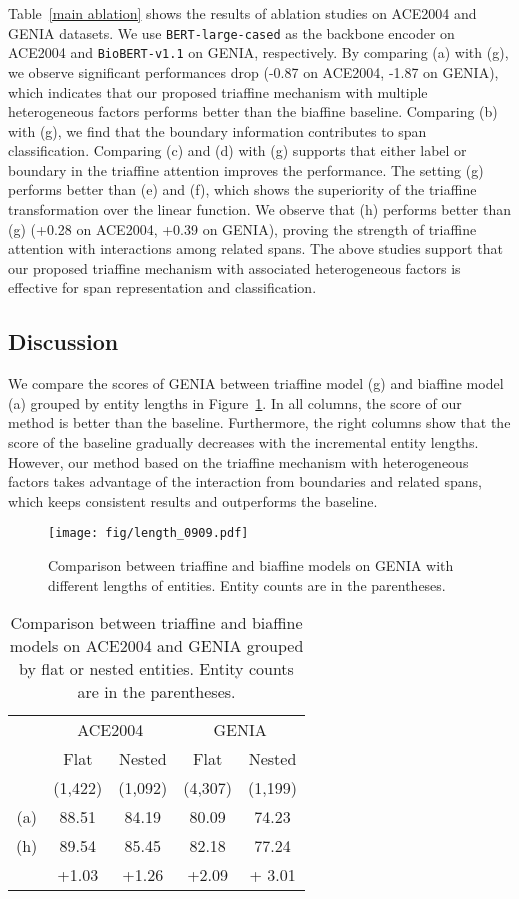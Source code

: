 \documentclass[11pt]{article}
\begin{document}
Table~\ref{main ablation} shows the results of ablation studies on ACE2004 and GENIA datasets. We use \texttt{BERT-large-cased} as the backbone encoder on ACE2004 and \texttt{BioBERT-v1.1} on GENIA, respectively.
By comparing (a) with (g), we observe significant performances drop (-0.87 on ACE2004, -1.87 on GENIA), which indicates that our proposed triaffine mechanism with multiple heterogeneous factors performs better than the biaffine baseline.
Comparing (b) with (g), we find that the boundary information contributes to span classification.
Comparing (c) and (d) with (g) supports that either label or boundary in the triaffine attention improves the performance.
The setting (g) performs better than (e) and (f), which shows the superiority of the triaffine transformation over the linear function.
We observe that (h) performs better than (g) (+0.28 on ACE2004, +0.39 on GENIA), proving the strength of triaffine attention with interactions among related spans.
The above studies support that our proposed triaffine mechanism with associated heterogeneous factors is effective for span representation and classification.

\subsection{Discussion}


We compare the  scores of GENIA between triaffine model (g) and biaffine model (a) grouped by entity lengths in Figure~\ref{ablation:length}. In all columns, the  score of our method is
better than the baseline. Furthermore, the right columns show that the  score of the baseline gradually decreases with the incremental entity lengths. However, our method based on the triaffine mechanism with heterogeneous factors takes advantage of the interaction from boundaries and related spans, which keeps consistent results and outperforms the baseline.

\begin{figure}[t]
\centering
\texttt{[image: fig/length\_0909.pdf]}
\caption{Comparison between triaffine and biaffine models on GENIA with different lengths of entities. Entity counts are in the parentheses.}
\label{ablation:length}
\end{figure}

\begin{table}[h]
\small
\centering
\begin{tabular}{ccccc}
\toprule
 & \multicolumn{2}{c}{ACE2004} & \multicolumn{2}{c}{GENIA} \\
 & Flat  & Nested & Flat & Nested\\
  & (1,422)  & (1,092) & (4,307) &  (1,199)\\
\midrule
(a) & 88.51 & 84.19 & 80.09 & 74.23\\
(h) & 89.54 & 85.45 & 82.18 & 77.24\\
 & +1.03 & +1.26 & +2.09 & + 3.01 \\
\bottomrule
\end{tabular}
\centering
\caption{Comparison between triaffine and biaffine models on ACE2004 and GENIA grouped by flat or nested entities. Entity counts are in the parentheses.}
\label{table:nest}
\end{table}
\end{document}

